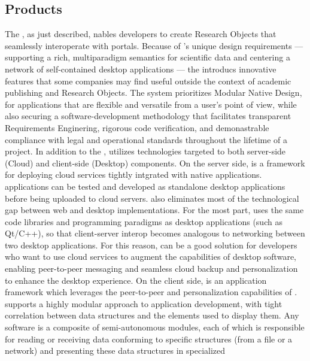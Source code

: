 \documentclass[10pt,letterpaper]{article}
\begin{document}
\subsection{{\lMOSAIC} Products}
The {\MOSAIC} {\SDK}, as just described, nables 
developers to create Research Objects that 
seamlessly interoperate with {\MOSAIC} 
portals.  Because of {\MOSAIC}'s unique design 
requirements --- supporting a 
rich, multiparadigm semantics for scientific data 
and centering a network of self-contained 
desktop applications --- the {\MOSAIC} {\SDK} 
introducs innovative features that some companies may 
find useful outside the context of academic 
publishing and Research Objects.  
The {\MOSAIC} system  
prioritizes Modular Native Design, for applications 
that are flexible and versatile 
from a user's point of view, 
while also securing a software-development methodology 
that facilitates transparent Requirements 
Enginering, rigorous code verification, 
and demonastrable compliance with 
legal and operational standards throughout the 
lifetime of a project.
\p{}
In addition to the {\SDK}, {\MOSAIC} utilizes technologies 
targeted to both server-side (Cloud) 
and client-side (Desktop) components.  On the 
server side, {\NDPCloud} is a framework for deploying 
cloud services tightly intgrated with native applications.  
{\NDPCloud} applications can be tested and 
developed as standalone desktop applications before 
being uploaded to cloud servers.  
{\NDPCloud} also eliminates most of the technological 
gap between web and desktop implementations.  
For the most part, {\NDPCloud} uses the same code libraries 
and programming paradigms as 
desktop applications (such as Qt/C++), 
so that client-server interop 
becomes analogous to networking between two 
desktop applications.  For this reason, {\NDPCloud} 
can be a good solution for developers who want to 
use cloud services to augment the capabilities 
of desktop software, enabling peer-to-peer 
messaging and seamless cloud backup and 
personalization to enhance the desktop experience.
\p{}
On the client side, {\VersatileUX} is an {\GUI} 
application framework which leverages 
the peer-to-peer and personalization 
capabilities of {\NDPCloud}.  {\VersatileUX} 
supports a highly modular approach to 
application development, with tight 
correlation between data structures and the {\GUI} 
elements used to display them.  Any {\VersatileUX} 
software is a composite of semi-autonomous  
modules, each of which is responsible for 
reading or receiving data conforming 
to specific structures (from a file or a network) 
and presenting these data structures in specialized 
\end{document}
